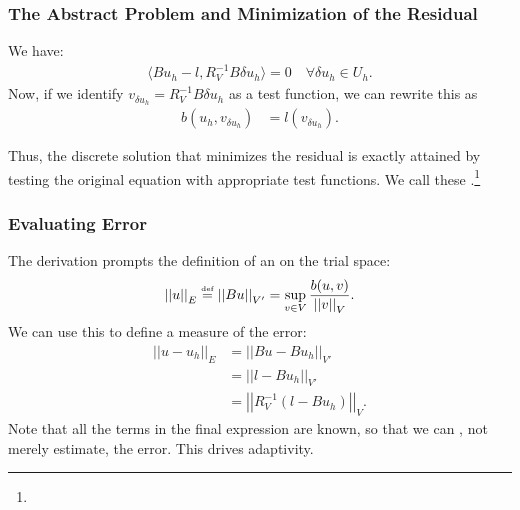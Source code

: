 \documentclass[mathserif]{beamer}
\newcommand{\NVRnorm}[1]{\left|\left|#1\right|\right|}
\newcommand{\NVReqdef}{\stackrel{\text{\tiny def}}{=}}
\newcommand{\pecosbold}[1]{{\color{pecos2}{#1}}}
\newcommand{\FootSize}{\scriptsize}
\begin{document}
\begin{frame}
\frametitle{The Abstract Problem and Minimization of the Residual}
We have:
\begin{align*}
\langle Bu_{h} - l, R_{V}^{-1}B \delta u_{h} \rangle = 0 \quad \forall \delta u_{h} \in U_{h}.
\end{align*}
Now, if we identify $v_{\delta u_{h}} = R_{V}^{-1}B \delta u_{h}$ as a test function, we can rewrite this as
\begin{align*}
b(u_{h},v_{\delta u_{h}}) &= l(v_{\delta u_{h}}).
\end{align*}

Thus, the discrete solution that minimizes the residual is exactly attained by testing the original equation with appropriate test functions.  We call these \pecosbold{optimal test functions}.\footnote{\FootSize {}}

\end{frame}

\begin{frame}
\frametitle{Evaluating Error}
The derivation prompts the definition of an \pecosbold{energy norm} on the trial space:
\[
\NVRnorm{u}_{E} \NVReqdef \NVRnorm{Bu}_{V'} = \sup_{v \in V} \frac{b(u,v)}{\NVRnorm{v}_{V}}.
\]
We can use this to define a measure of the error:
\begin{align*}
\NVRnorm{u - u_{h}}_{E} &= \NVRnorm{Bu - Bu_{h}}_{V'} \\
&=  \NVRnorm{l - Bu_{h}}_{V'} \\
&= \NVRnorm{R_{V}^{-1}\left(l - Bu_{h}\right)}_{V}.
\end{align*}
Note that all the terms in the final expression are known, so that we can \pecosbold{evaluate}, not merely estimate, the error.  This drives adaptivity.
\end{frame}
\end{document}
